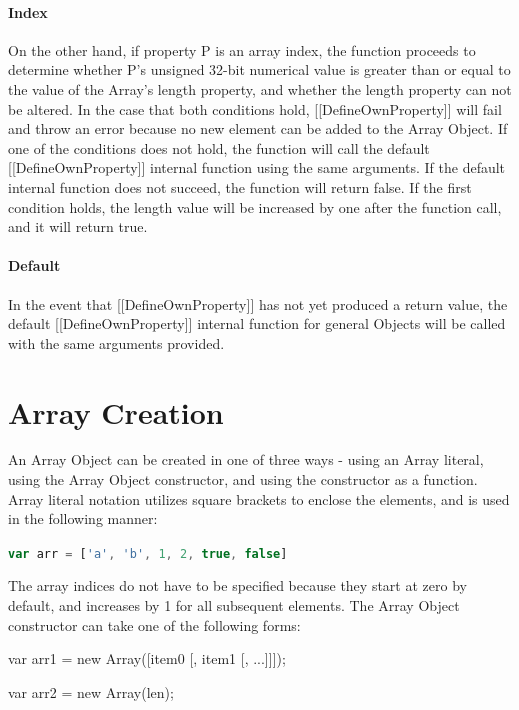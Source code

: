 \documentclass[a4paper,11pt,twoside]{report}
\def\jsinline{\lstinline[language=JavaScript, basicstyle=\small]}%\end{lstlisting}
\begin{document}
\paragraph{Index}
On the other hand, if property P is an array index, the function proceeds to determine whether P's unsigned 32-bit numerical value is greater than or equal to the value of the Array's length property, and whether the length property can not be altered. In the case that both conditions hold, [[DefineOwnProperty]] will fail and throw an error because no new element can be added to the Array Object. If one of the conditions does not hold, the function will call the default [[DefineOwnProperty]] internal function using the same arguments. If the default internal function does not succeed, the function will return false. If the first condition holds, the length value will be increased by one after the function call, and it will return true.

\paragraph{Default}
In the event that [[DefineOwnProperty]] has not yet produced a return value, the default [[DefineOwnProperty]] internal function for general Objects will be called with the same arguments provided.

\section{Array Creation}\label{sec:arraycreate}
An Array Object can be created in one of three ways - using an Array literal, using the Array Object constructor, and using the constructor as a function. Array literal notation utilizes square brackets to enclose the elements, and is used in the following manner:
\begin{center}
\jsinline|var arr = ['a', 'b', 1, 2, true, false]|
\end{center}


The array indices do not have to be specified because they start at zero by default, and increases by 1 for all subsequent elements. The Array Object constructor can take one of the following forms:

\begin{adjustwidth}{5cm}{4cm}
\begin{lstjs}
var arr1 = new Array([item0 [, item1 [, ...]]]);

var arr2 = new Array(len);
\end{lstjs}
\end{adjustwidth}
\end{document}
